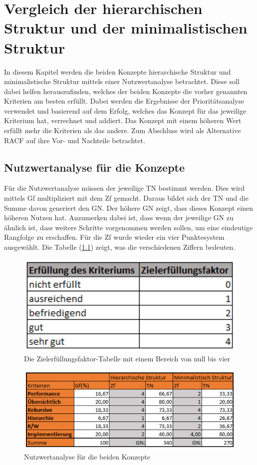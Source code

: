 \chapter{Vergleich der hierarchischen Struktur und der minimalistischen Struktur}
\label{ch:chapter05}
In diesem Kapitel werden die beiden Konzepte hierarchische Struktur und minimalistische Struktur mittels einer Nutzwertanalyse betrachtet.
Diese soll dabei helfen herauszufinden, welches der beiden Konzepte die vorher genannten Kriterien am besten erfüllt.
Dabei werden die Ergebnisse der Prioritätsanalyse verwendet und basierend auf dem Erfolg, welches das Konzept für das jeweilige Kriterium hat, verrechnet und addiert.
Das Konzept mit einem höheren Wert erfüllt mehr die Kriterien als das andere.
Zum Abschluss wird als Alternative \ac{RACF} auf ihre Vor- und Nachteile betrachtet.

\section{Nutzwertanalyse für die Konzepte}
\label{sec:chapter05:Nutz}
Für die Nutzwertanalyse müssen der jeweilige \ac{TN} bestimmt werden.
Dies wird mittels \ac{Gf} multipliziert mit dem \ac{Zf} gemacht.
Daraus bildet sich der \ac{TN} und die Summe davon generiert den \ac{GN}.
Der höhere \ac{GN} zeigt, dass dieses Konzept einen höheren Nutzen hat.
Anzumerken dabei ist, dass wenn der jeweilige \ac{GN} zu ähnlich ist, dass weitere Schritte vorgenommen werden sollen, um eine eindeutige Rangfolge zu erschaffen.
Für die \ac{Zf} wurde wieder ein vier Punktesystem ausgewählt.
Die Tabelle (\ref{fig:Ziel}) zeigt, was die verschiedenen Ziffern bedeuten. \cite{BdIufH}
\begin{figure}[h!]
 \centering
 \includegraphics[width=1\textwidth]{gfx/Picture/Ziel.PNG}
 \caption{Die Zielerfüllungsfaktor-Tabelle mit einem Bereich von null bis vier}
 \label{fig:Ziel}
\end{figure}
\newpage
\begin{figure}[h!]
 \centering
 \includegraphics[width=1\textwidth]{gfx/Picture/Nutzwert.PNG}
 \caption{Nutzwertanalyse für die beiden Konzepte}
 \label{fig:Nutz}
\end{figure}

